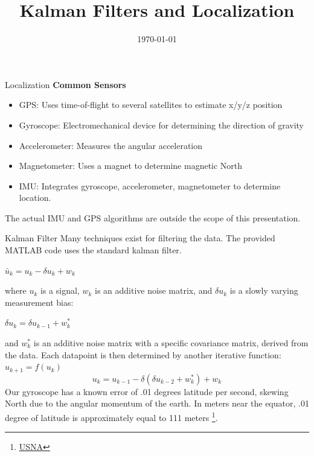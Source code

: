 \documentclass[10pt]{beamer}
\title{Kalman Filters and Localization}
\date{\today}
\theoremstyle{definition}
\let\olditem\item
\renewcommand{\item}{\setlength{\itemsep}{\fill}\olditem}
\begin{document}
\frame{\titlepage}

\begin{frame}{Localization}
\textbf{Common Sensors}
\begin{itemize}
    \item GPS: Uses time-of-flight to several satellites to estimate x/y/z position
    \item Gyroscope: Electromechanical device for determining the direction of gravity
    \item Accelerometer: Measures the angular acceleration
    \item Magnetometer: Uses a magnet to determine magnetic North
    \item IMU: Integrates gyroscope, accelerometer, magnetometer to determine location. 
\end{itemize}
The actual IMU and GPS algorithms are outside the scope of this presentation.
\end{frame}

\begin{frame}{Kalman Filter}
    Many techniques exist for filtering the data. The provided MATLAB code uses the standard kalman filter.
    
    $\bar{u}_k = u_k - \delta u_k + w_k$
    
    where $u_k$ is a signal, $w_k$ is an additive noise matrix, and $\delta u_k$ is a slowly varying measurement bias:
    
    $ \delta u_k = \delta u_{k-1} + w_k^*$

    and $w_k^*$ is an additive noise matrix with a specific covariance matrix, derived from the data. Each datapoint is then determined by another iterative function:
    $ u_{k+1} = f(u_k)$
    $$ u_k = u_{k-1} - \delta(\delta u_{k-2} + w_k^*) + w_k $$
    Our gyroscope has a known error of .01 degrees latitude per second, skewing North due to the angular momentum of the earth. In meters near the equator, .01 degree of latitude is approximately equal to 111 meters \footnote{\href{https://www.usna.edu/Users/oceano/pguth/md_help/html/approx_equivalents.htm}{USNA}}.  
\end{frame}

\end{document}
